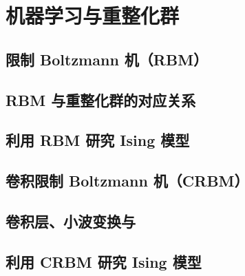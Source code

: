 \chapter{机器学习与重整化群}

\section{限制 Boltzmann 机（RBM）}
\section{RBM 与重整化群的对应关系}
\section{利用 RBM 研究 Ising 模型}
\section{卷积限制 Boltzmann 机（CRBM）}
\section{卷积层、小波变换与 \AdSCFT{}}
\section{利用 CRBM 研究 Ising 模型}

